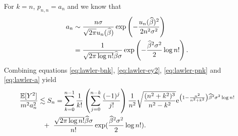 For $k=n$, $p_{n,n} = a_n$ and we know that
\begin{align}
a_n &\sim \frac{n\sigma}{\sqrt{2\pi}u_n(\widehat{\beta})}\exp\left(-\frac{u_n(\widehat{\beta})^2}
{2n^2\sigma^2}\right)\\
&= \frac{1}{\sqrt{2\pi \log n!}\widehat{\beta}\sigma}
\exp\left(-\frac{\widehat{\beta}^2\sigma^2}{2}\log n!\right). \label{eq:lawler-a}
\end{align}
Combining equations \eqref{eq:lawler-bnk}, \eqref{eq:lawler-ey2}, 
\eqref{eq:lawler-pnk} and \eqref{eq:lawler-a} yield
\begin{align}
\frac{{\mathbb{E}}[Y^2]}{m^2a_n^2} &\lesssim S_n = 
\sum_{k=0}^{n-1} \frac{1}{k!}\left(\sum_{j=0}^{n-k}\frac{(-1)^j}{j!}\right)
\frac{1}{n^2}\sqrt{\frac{(n^2+k^2)^3}{n^2-k^2}}\mathrm{e}^{\left(1-\frac{n^2}{n^2+k^2}\right)
\widehat{\beta}^2\sigma^2\log n!}\nonumber \\
&\   \,\,+\,\, \frac{\sqrt{2\pi\log n!}\widehat{\beta}\sigma}{n!}
\exp(\frac{\widehat{\beta}^2\sigma^2}{2}\log n!). \label{eq:lawler-fullsum}
\end{align}




